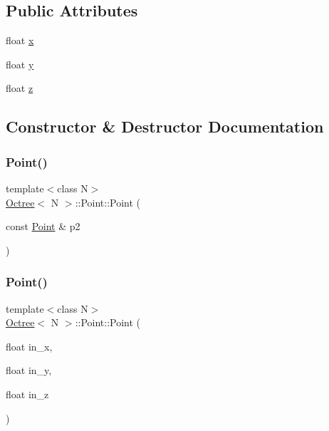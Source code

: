 \subsection*{Public Attributes}
\begin{DoxyCompactItemize}
\item 
float \hyperlink{structOctree_1_1Point_af248a5733444069fb49eae2c61a4a91d}{x}
\item 
float \hyperlink{structOctree_1_1Point_acc32ad295d8cdb18bfb341e98f78bd57}{y}
\item 
float \hyperlink{structOctree_1_1Point_a9f6d1c40cdecc339dee915f094eb7b7e}{z}
\end{DoxyCompactItemize}


\subsection{Constructor \& Destructor Documentation}
\mbox{\label{structOctree_1_1Point_a8fb37f6be2d72663f65679a6bdf8a072}} 
\subsubsection{\texorpdfstring{Point()}{Point()}\hspace{0.1cm}{\footnotesize\ttfamily [1/3]}}
{\footnotesize\ttfamily template$<$class N$>$ \\
\hyperlink{classOctree}{Octree}$<$ N $>$\+::Point\+::\+Point (\begin{DoxyParamCaption}\item[{const \hyperlink{structOctree_1_1Point}{Point} \&}]{p2 }\end{DoxyParamCaption})\hspace{0.3cm}{\ttfamily [inline]}}

\mbox{\label{structOctree_1_1Point_aa975ea20806ba51e539babf90d02d8fe}} 
\subsubsection{\texorpdfstring{Point()}{Point()}\hspace{0.1cm}{\footnotesize\ttfamily [2/3]}}
{\footnotesize\ttfamily template$<$class N$>$ \\
\hyperlink{classOctree}{Octree}$<$ N $>$\+::Point\+::\+Point (\begin{DoxyParamCaption}\item[{float}]{in\+\_\+x,  }\item[{float}]{in\+\_\+y,  }\item[{float}]{in\+\_\+z }\end{DoxyParamCaption})\hspace{0.3cm}{\ttfamily [inline]}}

